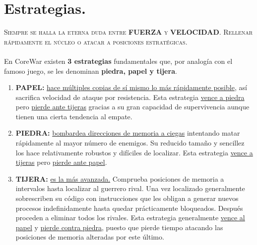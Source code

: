 \newpage
\section{Estrategias.}
\noindent
\textsc{Siempre se halla la eterna duda entre \textbf{FUERZA} y \textbf{VELOCIDAD}.
\newline Rellenar rápidamente el núcleo o atacar a posiciones estratégicas.} \\
\\ En CoreWar existen \textbf{3 estrategias} fundamentales que, por analogía con el famoso juego, se les denominan \textbf{piedra, papel y tijera}.

\begin{tcolorbox}[colframe=black!75!blue]
    \begin{enumerate}
        \item \textbf{PAPEL: } \underline{hace múltiples copias de sí mismo lo más rápidamente posible}, así sacrifica velocidad de ataque por resistencia.
        \newline Esta estrategia \underline{vence a piedra} pero \underline{pierde ante tijeras} gracias a su gran capacidad de supervivencia aunque tienen una cierta tendencia al empate. 
        \item  \textbf{PIEDRA: } \underline{bombardea direcciones de memoria a ciegas} intentando matar rápidamente al mayor número de enemigos. Su reducido tamaño y sencillez los hace relativamente robustos y difíciles de localizar.
        \newline Esta estrategia \underline{vence a tijeras} pero \underline{pierde ante papel}. 
         \item \textbf{TIJERA: } \underline{es la más avanzada.} Comprueba posiciones de memoria a intervalos hasta localizar al guerrero rival. Una vez localizado generalmente sobrescriben su código con instrucciones que les obligan a generar nuevos procesos indefinidamente hasta quedar prácticamente bloqueados. Después proceden a eliminar todos los rivales.
         \newline Esta estrategia generalmente \underline{vence al papel} y \underline{pierde contra piedra}, puesto que pierde tiempo atacando las posiciones de memoria alteradas por este último. 
    \end{enumerate}
\end{tcolorbox}